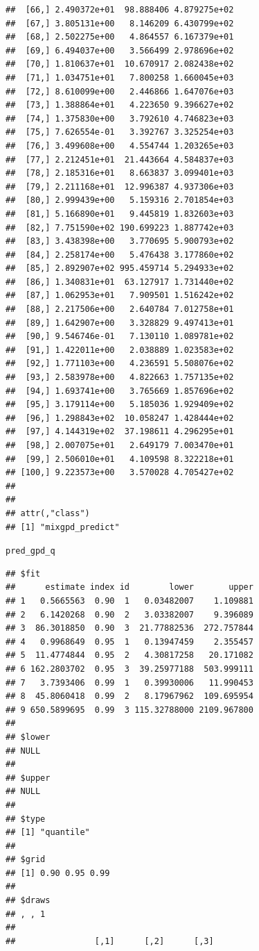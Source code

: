 \documentclass[article]{jss}\usepackage[]{graphicx}\usepackage[]{xcolor}
\makeatletter
\newcommand{\hldef}[1]{\textcolor[rgb]{0.345,0.345,0.345}{#1}}%
\newenvironment{kframe}{%
 \def\at@end@of@kframe{}%
 \ifinner\ifhmode%
  \def\at@end@of@kframe{\end{minipage}}%
  \begin{minipage}{\columnwidth}%
 \fi\fi%
 \def\FrameCommand##1{\hskip\@totalleftmargin \hskip-\fboxsep
 \colorbox{shadecolor}{##1}\hskip-\fboxsep
     \hskip-\linewidth \hskip-\@totalleftmargin \hskip\columnwidth}%
 \MakeFramed {\advance\hsize-\width
   \@totalleftmargin\z@ \linewidth\hsize
   \@setminipage}}%
 {\par\unskip\endMakeFramed%
 \at@end@of@kframe}
\newenvironment{knitrout}{}{} %
\makeatother
\begin{document}
\begin{knitrout}
\begin{kframe}
\begin{verbatim}
##  [66,] 2.490372e+01  98.888406 4.879275e+02
##  [67,] 3.805131e+00   8.146209 6.430799e+02
##  [68,] 2.502275e+00   4.864557 6.167379e+01
##  [69,] 6.494037e+00   3.566499 2.978696e+02
##  [70,] 1.810637e+01  10.670917 2.082438e+02
##  [71,] 1.034751e+01   7.800258 1.660045e+03
##  [72,] 8.610099e+00   2.446866 1.647076e+03
##  [73,] 1.388864e+01   4.223650 9.396627e+02
##  [74,] 1.375830e+00   3.792610 4.746823e+03
##  [75,] 7.626554e-01   3.392767 3.325254e+03
##  [76,] 3.499608e+00   4.554744 1.203265e+03
##  [77,] 2.212451e+01  21.443664 4.584837e+03
##  [78,] 2.185316e+01   8.663837 3.099401e+03
##  [79,] 2.211168e+01  12.996387 4.937306e+03
##  [80,] 2.999439e+00   5.159316 2.701854e+03
##  [81,] 5.166890e+01   9.445819 1.832603e+03
##  [82,] 7.751590e+02 190.699223 1.887742e+03
##  [83,] 3.438398e+00   3.770695 5.900793e+02
##  [84,] 2.258174e+00   5.476438 3.177860e+02
##  [85,] 2.892907e+02 995.459714 5.294933e+02
##  [86,] 1.340831e+01  63.127917 1.731440e+02
##  [87,] 1.062953e+01   7.909501 1.516242e+02
##  [88,] 2.217506e+00   2.640784 7.012758e+01
##  [89,] 1.642907e+00   3.328829 9.497413e+01
##  [90,] 9.546746e-01   7.130110 1.089781e+02
##  [91,] 1.422011e+00   2.038889 1.023583e+02
##  [92,] 1.771103e+00   4.236591 5.508076e+02
##  [93,] 2.583978e+00   4.822663 1.757135e+02
##  [94,] 1.693741e+00   3.765669 1.857696e+02
##  [95,] 3.179114e+00   5.185036 1.929409e+02
##  [96,] 1.298843e+02  10.058247 1.428444e+02
##  [97,] 4.144319e+02  37.198611 4.296295e+01
##  [98,] 2.007075e+01   2.649179 7.003470e+01
##  [99,] 2.506010e+01   4.109598 8.322218e+01
## [100,] 9.223573e+00   3.570028 4.705427e+02
## 
## 
## attr(,"class")
## [1] "mixgpd_predict"
\end{verbatim}
\begin{alltt}
\hldef{pred_gpd_q}
\end{alltt}
\begin{verbatim}
## $fit
##      estimate index id        lower       upper
## 1   0.5665563  0.90  1   0.03482007    1.109881
## 2   6.1420268  0.90  2   3.03382007    9.396089
## 3  86.3018850  0.90  3  21.77882536  272.757844
## 4   0.9968649  0.95  1   0.13947459    2.355457
## 5  11.4774844  0.95  2   4.30817258   20.171082
## 6 162.2803702  0.95  3  39.25977188  503.999111
## 7   3.7393406  0.99  1   0.39930006   11.990453
## 8  45.8060418  0.99  2   8.17967962  109.695954
## 9 650.5899695  0.99  3 115.32788000 2109.967800
## 
## $lower
## NULL
## 
## $upper
## NULL
## 
## $type
## [1] "quantile"
## 
## $grid
## [1] 0.90 0.95 0.99
## 
## $draws
## , , 1
## 
##                [,1]      [,2]      [,3]

\end{verbatim}
\end{kframe}
\end{knitrout}
\end{document}
